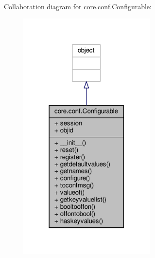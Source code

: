 Collaboration diagram for core.\+conf.\+Configurable\+:
\nopagebreak
\begin{figure}[H]
\begin{center}
\leavevmode
\includegraphics[width=195pt]{classcore_1_1conf_1_1_configurable__coll__graph}
\end{center}
\end{figure}
